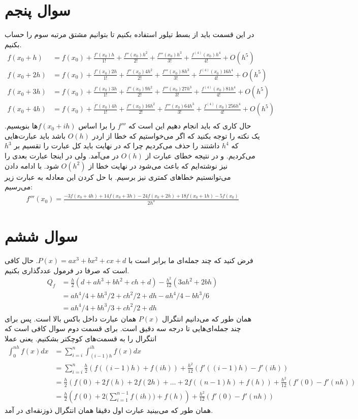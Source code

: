\documentclass[]{article}
\begin{document}
\section*{سوال پنجم}
در این قسمت باید از بسط تیلور استفاده بکنیم تا بتوانیم مشتق مرتبه سوم را حساب بکنیم.
\begin{align*}
    f(x_0 + h)  &= f(x_0) + \frac{f'(x_0)h}{1!} + \frac{f''(x_0)h^2}{2!} + \frac{f'''(x_0)h^3}{3!} + \frac{f^{(4)}(x_0)h^4}{4!} + O(h^5)\\
    f(x_0 + 2h) &= f(x_0) + \frac{f'(x_0)2h}{1!} + \frac{f''(x_0)4h^2}{2!} + \frac{f'''(x_0)8h^3}{3!} + \frac{f^{(4)}(x_0)16h^4}{4!} + O(h^5)\\
    f(x_0 + 3h) &= f(x_0) + \frac{f'(x_0)3h}{1!} + \frac{f''(x_0)9h^2}{2!} + \frac{f'''(x_0)27h^3}{3!} + \frac{f^{(4)}(x_0)81h^4}{4!} + O(h^5)\\
    f(x_0 + 4h) &= f(x_0) + \frac{f'(x_0)4h}{1!} + \frac{f''(x_0)16h^2}{2!} + \frac{f'''(x_0)64h^3}{3!} + \frac{f^{(4)}(x_0)256h^4}{4!} + O(h^5)\\
\end{align*}
حال کاری که باید انجام دهیم این است که
$f'''$
را برا اساس
$f(x_0 + ih)$ها
بنویسیم. یک نکته را توجه بکنید که اگر می‌خواستیم که خطا از اردر
$O(h)$
باشد باید عبارت‌هایی که
$h^4$
داشتند را حذف می‌کردیم چرا که در نهایت باید کل عبارت را تقسیم بر
$h^3$
می‌کردیم. و در نتیجه خطای عبارت از
$O(h)$
در می‌آمد. ولی در اینجا عبارت بعدی را نیز نوشته‌ایم که باعث می‌شود در نهایت خطا از
$O(h^2)$
شود. با ادامه دادن می‌توانستیم خطا‌‌های کمتری نیز برسیم. با حل کردن این معادله به عبارت زیر می‌رسیم:
\begin{gather*}
    f'''(x_0) = \frac{-3f(x_0 + 4h) + 14f(x_0 + 3h) - 24f(x_0 + 2h) + 18f(x_0 + 1h) - 5f(x_0)}{2h^3}
\end{gather*}
\section*{سوال ششم}
فرض کنید که چند جمله‌ای ما برابر است با
$P(x) = ax^3 + bx^2 + cx + d$. حال کافی است که صرفا در فرمول عددگذاری بکنیم.
\begin{align*}
    Q_f &= \frac{h}{2}(d + ah^3 + bh^2 + ch + d) - \frac{h^2}{12} (3ah^2 + 2bh)\\
    &= ah^4/4 + bh^3/2 + ch^2/2 + dh - ah^4/4 - bh^3/6\\
    &= \boxed{ah^4/4 + bh^3/3 + ch^2/2 + dh}
\end{align*}
همان طور که می‌دانیم انتگرال
$P(x)$
همان عبارت داخل باکس بالا است. پس برای چند جمله‌ای‌هایی تا درجه سه دقیق است.
برای قسمت دوم سوال کافی است که انتگرال را به قسمت‌های کوچکتر بشکنیم. یعنی عملا
\begin{align*}
    \int_{0}^{nh} f(x) dx &= \sum_{i=i}^{n} \int_{(i-1)h}^{ih} f(x)dx\\
    &= \sum_{i=i}^{n} \frac{h}{2}(f((i-1)h) + f(ih)) + \frac{h^2}{12} (f'((i-1)h) - f'(ih))\\
    &= \frac{h}{2}(f(0) + 2f(h) + 2f(2h) + \dots + 2f((n - 1)h) + f(h)) + \frac{h^2}{12} (f'(0) - f'(nh))\\
    &= \frac{h}{2}(f(0) + 2 \bigl(\sum_{i=1}^{n-1} f(ih)\bigr) + f(h)) + \frac{h^2}{12} (f'(0) - f'(nh))
\end{align*}
همان طور که می‌بینید عبارت اول دقیقا همان انتگرال ذوزنقه‌ای در آمد.
\end{document}
